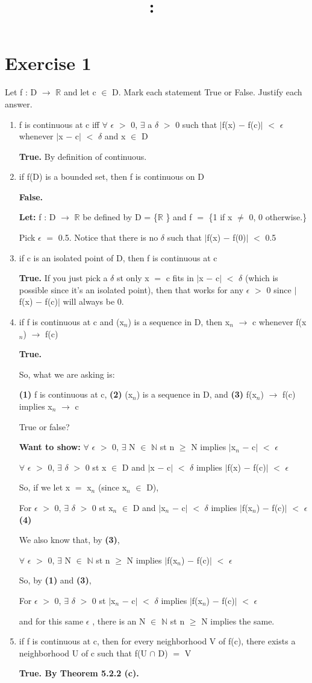 \documentclass{article}
\title{
    \vspace{2in}
    \textmd{\textbf{\hmwkClass:\ \hmwkTitle}}\\
    \normalsize\vspace{0.1in}\small\vspace{0.1in}\large{\textit{\hmwkClassInstructor}}
    \vspace{3in}
}
\author{\hmwkAuthorName}
\date{}
\newcommand{\mt}[1]{\ensuremath{#1}}
\newcommand\bsc[2][\DefaultOpt]{%
  \def\DefaultOpt{#2}%
  \section[#1]{#2}%
}
\newcommand{\balist}{\begin{enumerate}[label=\alph*.]}
\newcommand{\elist}{\end{enumerate}}
\newcommand{\lt}[1]{\textbf{Let: } #1}
\newcommand{\wts}[1]{\textbf{Want to show: } #1}
\newcommand{\bpth}[1]{\textbf{(#1)}}
\newcommand{\br}{\mt{\mathbb{R}} }       %
\newcommand{\bn}{\mt{\mathbb{N}} }       %
\newcommand{\ep}{\mt{\epsilon} }         %
\newcommand{\fa}{\mt{\forall} }          %
\newcommand{\dta}{\mt{\delta} }
\newcommand{\mem}{\mt{\in} }
\newcommand{\exs}{\mt{\exists} }
\newcommand{\lra}{ \mt{\longrightarrow} } %
\newcommand{\av}[1]{\mt{|}#1\mt{|}}  %
\newcommand{\prn}[1]{(#1)}
\newcommand{\bk}[1]{\{#1\}}
\newcommand{\ms}{\mt{-} }
\newcommand{\ls}{\mt{<} }
\newcommand{\gr}{\mt{>} }
\newcommand{\gre}{\mt{\geq} }
\newcommand{\eql}{\mt{=} }
\newcommand{\uw}[2]{#1\mt{_{#2}}}
\newcommand{\inn}{\mt{\cap} }
\begin{document}
\bsc{Exercise 1}{

Let f : D \lra \br and let c \mem D. Mark each statement True or False. Justify each answer.

\balist
\item f is continuous at c iff \fa \ep \gr 0, \exs a \dta \gr 0 such that \av{f(x) \ms f(c)} \ls \ep whenever \av{x \ms c} \ls \dta and x \mem D
	
	\textbf{True.} By definition of continuous.
\item if f(D) is a bounded set, then f is continuous on D
	
	\textbf{False.}
	
	\lt{f : D \lra \br be defined by D = \bk{\br} and f \eql \bk{1 if x $\neq$ 0, 0 otherwise.}}
	
	Pick \ep \eql 0.5. Notice that there is no \dta such that \av{f(x) \ms f(0)} \ls 0.5
\item if c is an isolated point of D, then f is continuous at c
	
	\textbf{True.} If you just pick a \dta st only x \eql c fits in \av{x \ms c} \ls \dta (which is possible since it's an isolated point), then that works for any \ep \gr 0 since \av{f(x) \ms f(c)} will always be 0.
\item if f is continuous at c and \prn{\uw{x}{n}} is a sequence in D, then \uw{x}{n} \lra c whenever f(\uw{x}{n}) \lra f(c)

	\textbf{True.}
	
	So, what we are asking is:
	
	\bpth{1} f is continuous at c, \bpth{2} \prn{\uw{x}{n}} is a sequence in D, and \bpth{3} f(\uw{x}{n}) \lra f(c) implies \uw{x}{n} \lra c 
	
	True or false?
	
	\wts{\fa \ep \gr 0, \exs N \mem \bn st n \gre N implies \av{\uw{x}{n} \ms c} \ls \ep}
	
	\fa \ep \gr 0, \exs \dta \gr 0 st x \mem D and \av{x \ms c} \ls \dta implies \av{f(x) \ms f(c)} \ls \ep
	
	So, if we let x \eql \uw{x}{n} (since \uw{x}{n} \mem D),
	
	For \ep \gr 0, \exs \dta \gr 0 st \uw{x}{n} \mem D and \av{\uw{x}{n} \ms c} \ls \dta implies \av{f(\uw{x}{n}) \ms f(c)} \ls \ep \bpth{4}
	
	We also know that, by \bpth{3},
	
	\fa \ep \gr 0, \exs N \mem \bn st n \gre N implies \av{f(\uw{x}{n}) \ms f(c)} \ls \ep
	
	So, by \bpth{1} and \bpth{3},
	
	For \ep \gr 0, \exs \dta \gr 0 st \av{\uw{x}{n} \ms c} \ls \dta implies \av{f(\uw{x}{n}) \ms f(c)} \ls \ep
	
	and for this same \ep, there is an N \mem \bn st n \gre N implies the same.
	
	
\item if f is continuous at c, then for every neighborhood V of f(c), there exists a neighborhood U of c such that f(U \inn D) \eql V
	
	\textbf{True. By Theorem 5.2.2 (c).}
\elist

}
\end{document}
